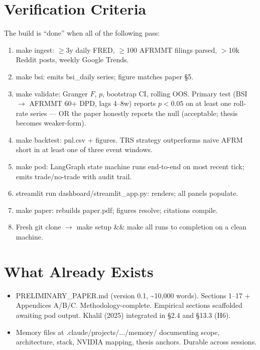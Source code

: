 \documentclass[11pt]{article}
\newcommand{\inlinecode}[1]{{\ttfamily\small #1}}
\begin{document}
\section{Verification Criteria}

The build is ``done'' when all of the following pass:

\begin{enumerate}
  \item \inlinecode{make ingest}: $\ge$3y daily FRED, $\ge$100 AFRMMT filings parsed, $>$10k Reddit posts, weekly Google Trends.
  \item \inlinecode{make bsi}: emits \inlinecode{bsi\_daily} series; figure matches paper \S5.
  \item \inlinecode{make validate}: Granger $F$, $p$, bootstrap CI, rolling OOS. Primary test (BSI $\to$ AFRMMT 60+ DPD, lags 4--8w) reports $p < 0.05$ on at least one roll-rate series --- OR the paper honestly reports the null (acceptable; thesis becomes weaker-form).
  \item \inlinecode{make backtest}: \inlinecode{pnl.csv} + figures. TRS strategy outperforms naive AFRM short in at least one of three event windows.
  \item \inlinecode{make pod}: LangGraph state machine runs end-to-end on most recent tick; emits trade/no-trade with audit trail.
  \item \inlinecode{streamlit run dashboard/streamlit\_app.py}: renders; all panels populate.
  \item \inlinecode{make paper}: rebuilds \inlinecode{paper.pdf}; figures resolve; citations compile.
  \item Fresh \inlinecode{git clone} $\to$ \inlinecode{make setup \&\& make all} runs to completion on a clean machine.
\end{enumerate}

\section{What Already Exists}

\begin{itemize}
  \item \inlinecode{PRELIMINARY\_PAPER.md} (version 0.1, \textasciitilde10{,}000 words). Sections 1--17 + Appendices A/B/C. Methodology-complete. Empirical sections scaffolded awaiting pod output. Khalil (2025) integrated in \S2.4 and \S13.3 (H6).
  \item Memory files at \inlinecode{.claude/projects/.../memory/} documenting scope, architecture, stack, NVIDIA mapping, thesis anchors. Durable across sessions.
\end{itemize}
\end{document}
